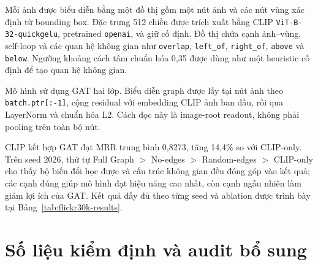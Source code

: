 Mỗi ảnh được biểu diễn bằng một đồ thị gồm một nút ảnh và các nút vùng xác định từ bounding box. Đặc trưng 512 chiều được trích xuất bằng CLIP \texttt{ViT-B-32-quickgelu}, pretrained \texttt{openai}, và giữ cố định. Đồ thị chứa cạnh ảnh--vùng, self-loop và các quan hệ không gian như \texttt{overlap}, \texttt{left\_of}, \texttt{right\_of}, \texttt{above} và \texttt{below}. Ngưỡng khoảng cách tâm chuẩn hóa 0,35 được dùng như một heuristic cố định để tạo quan hệ không gian.

Mô hình sử dụng GAT hai lớp. Biểu diễn graph được lấy tại nút ảnh theo \texttt{batch.ptr[:-1]}, cộng residual với embedding CLIP ảnh ban đầu, rồi qua LayerNorm và chuẩn hóa L2. Cách đọc này là image-root readout, không phải pooling trên toàn bộ nút.

CLIP kết hợp GAT đạt MRR trung bình 0,8273, tăng 14,4\% so với CLIP-only. Trên seed 2026, thứ tự Full Graph $>$ No-edges $>$ Random-edges $>$ CLIP-only cho thấy bộ biến đổi học được và cấu trúc không gian đều đóng góp vào kết quả; các cạnh đúng giúp mô hình đạt hiệu năng cao nhất, còn cạnh ngẫu nhiên làm giảm lợi ích của GAT. Kết quả đầy đủ theo từng seed và ablation được trình bày tại Bảng~\ref{tab:flickr30k-results}.

\begin{table}[H]
\centering
\small
\caption{Kết quả truy hồi trên Flickr30k Entities}
\label{tab:flickr30k-results}
\end{table}

\section{Số liệu kiểm định và audit bổ sung}
\label{app:supplementary-audit}

